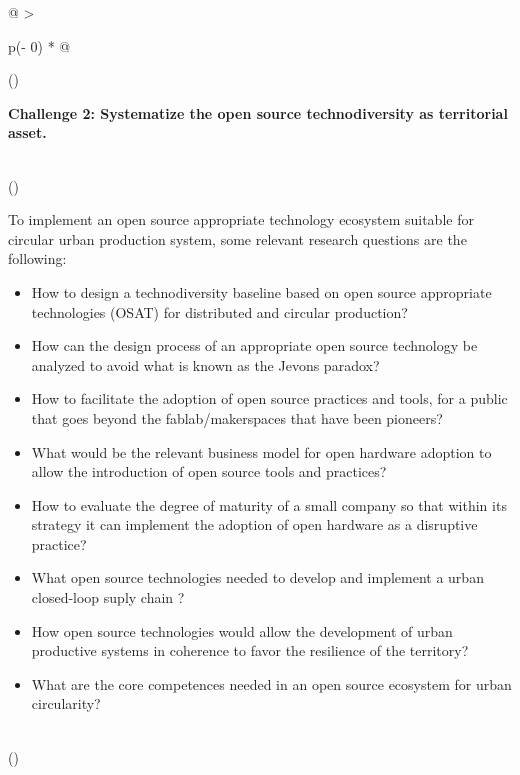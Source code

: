 \documentclass[
  12pt,
  a4paperpaper,
  onecolumn]{article}
\begin{document}
\begin{longtable}[]{@{}
  >{\raggedright\arraybackslash}p{(\columnwidth - 0\tabcolsep) * }@{}}
\toprule()
\begin{minipage}[b]{\linewidth}\raggedright
\textbf{Challenge 2: Systematize the open source technodiversity as
territorial asset.}
\end{minipage} \\
\midrule()
\endhead
\begin{minipage}[t]{\linewidth}\raggedright
To implement an open source appropriate technology ecosystem suitable
for circular urban production system, some relevant research questions
are the following:

\begin{itemize}
\item
  How to design a technodiversity baseline based on open source
  appropriate technologies (OSAT) for distributed and circular
  production?
\item
  How can the design process of an appropriate open source technology be
  analyzed to avoid what is known as the Jevons paradox?
\item
  How to facilitate the adoption of open source practices and tools, for
  a public that goes beyond the fablab/makerspaces that have been
  pioneers?
\item
  What would be the relevant business model for open hardware adoption
  to allow the introduction of open source tools and practices?
\item
  How to evaluate the degree of maturity of a small company so that
  within its strategy it can implement the adoption of open hardware as
  a disruptive practice?
\item
  What open source technologies needed to develop and implement a urban
  closed-loop suply chain ?
\item
  How open source technologies would allow the development of urban
  productive systems in coherence to favor the resilience of the
  territory?
\item
  What are the core competences needed in an open source ecosystem for
  urban circularity?
\end{itemize}
\end{minipage} \\
\bottomrule()
\end{longtable}
\end{document}
